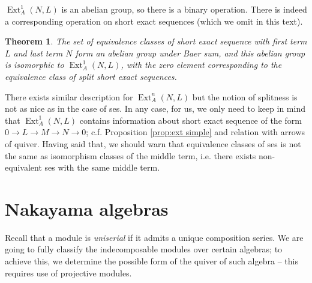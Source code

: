 \documentclass[11pt,a4paper]{article}
\numberwithin{equation}{section}
\theoremstyle{all}
\newtheorem{theorem}{Theorem}[section]
\theoremstyle{remark}
\newcommand{\Ext}{\operatorname{Ext}\nolimits}
\newcommand{\defn}[1]{\textsl{\color{darkblue} #1}}
\begin{document}
$\Ext_A^1(N,L)$ is an abelian group, so there is a binary operation.  There is indeed a corresponding operation on short exact sequences (which we omit in this text).

\begin{theorem}
The set of equivalence classes of short exact sequence with first term $L$ and last term $N$ form an abelian group under \defn{Baer sum}, and this abelian group is isomorphic to $\Ext_A^1(N,L)$, with the zero element corresponding to the equivalence class of split short exact sequences.
\end{theorem}

There exists similar description for $\Ext_A^n(N,L)$ but the notion of splitness is not as nice as in the case of ses.
In any case, for us, we only need to keep in mind that $\Ext_A^1(N,L)$ contains information about short exact sequence of the form $0\to L\to M\to N\to 0$; c.f. Proposition \ref{prop:ext simple} and relation with arrows of quiver.
Having said that, we should warn that equivalence classes of ses is not the same as isomorphism classes of the middle term, i.e. there exists non-equivalent ses with the same middle term.


\pagebreak


\section{Nakayama algebras}

Recall that a module is \defn{uniserial} if it admits a unique composition series.
We are going to fully classify the indecomposable modules over certain algebras; to achieve this, we determine the possible form of the quiver of such algebra -- this requires use of projective modules.
\end{document}
